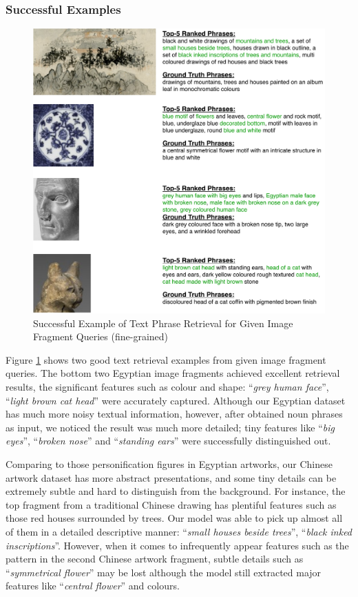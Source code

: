 \subsubsection{Successful Examples}

\begin{figure}[h!]
\centering
\includegraphics[width=\textwidth]{i2t.pdf}
\caption{Successful Example of Text Phrase Retrieval for Given Image Fragment Queries (fine-grained)}
\label{fig:i2t}
\end{figure}
Figure \ref{fig:i2t} shows two good text retrieval examples from given image fragment queries. The bottom two Egyptian image fragments achieved excellent retrieval results, the significant features such as colour and shape: ``\textit{grey human face}'', ``\textit{light brown cat head}'' were accurately captured. Although our Egyptian dataset has much more noisy textual information, however, after obtained noun phrases as input, we noticed the result was much more detailed; tiny features like ``\textit{big eyes}'', ``\textit{broken nose}'' and ``\textit{standing ears}'' were successfully distinguished out. 

Comparing to those personification figures in Egyptian artworks, our Chinese artwork dataset has more abstract presentations, and some tiny details can be extremely subtle and hard to distinguish from the background. For instance, the top fragment from a traditional Chinese drawing has plentiful features such as those red houses surrounded by trees. Our model was able to pick up almost all of them in a detailed descriptive manner: ``\textit{small houses beside trees}'', ``\textit{black inked inscriptions}''. However, when it comes to infrequently appear features such as the pattern in the second Chinese artwork fragment, subtle details such as ``\textit{symmetrical flower}'' may be lost although the model still extracted major features like ``\textit{central flower}'' and colours.


